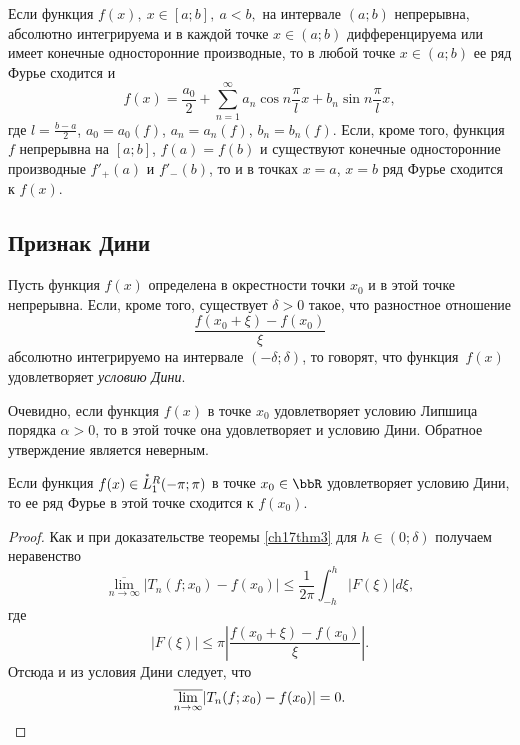 \begin{cons}
Если функция $f(x), \: x \in [a;b], \: a < b,$ на интервале $(a;b)$ непрерывна, абсолютно интегрируема и в каждой точке $x \in (a;b)$ дифференцируема или имеет конечные односторонние производные, то в любой точке $x \in (a;b)$ ее ряд Фурье сходится и 
$$
f(x) = \frac{a_0}{2} + \sum_{n = 1}^{\infty} a_n \cos{n \frac{\pi}{l} x} + b_n \sin{n \frac{\pi}{l} x},
$$
где $l = \frac{b - a}{2}$, $a_0 = a_0(f)$, $a_n = a_n(f)$, $b_n = b_n(f)$. Если, кроме того, функция $f$ непрерывна на $[a;b]$, $f(a) = f(b)$ и существуют конечные односторонние производные $f'_+(a)$ и $f'_-(b)$, то и в точках $x = a$, $x = b$ ряд Фурье сходится к $f(x)$.
\end{cons}


\subsection{Признак Дини}
Пусть функция $f(x)$ определена в окрестности точки $x_0$ и в этой точке непрерывна. Если, кроме того, существует $\delta > 0$ такое, что разностное отношение
$$
\frac{f(x_0 + \xi) - f(x_0)}{\xi}
$$
абсолютно интегрируемо на интервале $(-\delta;\delta)$, то говорят, что функция~$f(x)$ удовлетворяет \textit{условию Дини}.

Очевидно, если функция $f(x)$ в точке $x_0$ удовлетворяет условию Липшица порядка $\alpha > 0$, то в этой точке она удовлетворяет и условию Дини. Обратное утверждение является неверным.

\begin{thm}  \label{ch17thm4}
Если функция $f(x) \in \accentset{*}{L}^{R}_1(-\pi;\pi)$ в точке $x_0 \in \bbR$ удовлетворяет условию Дини, то ее ряд Фурье в этой точке сходится к $f(x_0)$.
\end{thm}
\begin{proof}
Как и при доказательстве теоремы \ref{ch17thm3} для $h \in (0;\delta)$ получаем неравенство
$$
\overline{\lim\limits_{n \to \infty}}|T_n(f; x_0) - f(x_0)| \le \frac{1}{2\pi}\int_{-h}^{h}|F(\xi)|d\xi,
$$
где
$$
|F(\xi)| \le \pi\left|\frac{f(x_0 + \xi) - f(x_0)}{\xi}\right|.
$$
Отсюда и из условия Дини следует, что
\begin{equation*}
\overline{\lim\limits_{n \to \infty}}|T_n(f; x_0) - f(x_0)| = 0. \qedhere
\end{equation*}
\end{proof}


